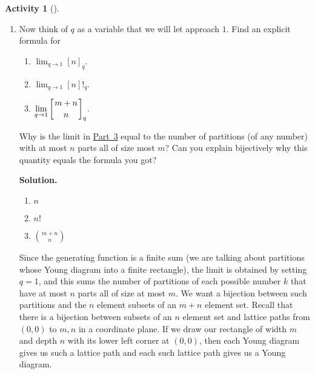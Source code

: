 \documentclass[10pt,]{book}
\theoremstyle{plain}
\theoremstyle{definition}
\newtheorem{activity}[project]{Activity}
\numberwithin{equation}{chapter}
\newcommand{\qchoose}[2]{\left[{#1\atop#2}\right]_q}
\begin{document}
\begin{activity}[]
\begin{enumerate}[label=(\alph*)]
~\par
\item Now think of \(q\) as a variable that we will let approach \(1\). Find an explicit formula for \leavevmode%
\begin{enumerate}
\item\hypertarget{li-74}{}\(\displaystyle\lim_{q\rightarrow 1} [n]_q\).%
\item\hypertarget{li-75}{}\(\displaystyle\lim_{q\rightarrow 1} [n]!_q\).%
\item\hypertarget{q-binomial-lim}{}\(\displaystyle\lim_{q\rightarrow 1} \qchoose{m+n}{n}\).%
\end{enumerate}
 Why is the limit in \hyperlink{q-binomial-lim}{Part~3} equal to the number of partitions (of any number) with at most \(n\) parts all of size most \(m\)? Can you explain bijectively why this quantity equals the formula you got?%
\par\medskip\noindent%
\textbf{Solution.}\quad \leavevmode%
\begin{enumerate}
\item\hypertarget{li-77}{}\(n\)%
\item\hypertarget{li-78}{}\(n!\)%
\item\hypertarget{li-79}{}\(\binom{m+n}{n}\)%
\end{enumerate}
 Since the generating function is a finite sum (we are talking about partitions whose Young diagram into a finite rectangle), the limit is obtained by setting \(q=1\), and this sums the number of partitions of each possible number \(k\) that have at most \(n\) parts all of size at most \(m\). We want a bijection between such partitions and the \(n\) element subsets of an \(m+n\) element set. Recall that there is a bijection between subsets of an \(n\) element set and lattice paths from \((0,0)\) to \(m,n\) in a coordinate plane. If we draw our rectangle of width \(m\) and depth \(n\) with its lower left corner at \((0,0)\), then each Young diagram gives us such a lattice path and each such lattice path gives us a Young diagram.%


\end{enumerate}
\end{activity}
\end{document}
